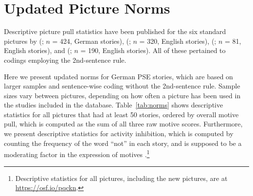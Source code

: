 \documentclass[man,a4paper,mask]{apa6}\usepackage[]{graphicx}\usepackage[]{color}
\begin{document}
\section{Updated Picture Norms}

Descriptive picture pull statistics have been published for the six standard pictures by \citeauthor{schultheiss_AssessmentImplicitMotives_2001} (\citeyear{schultheiss_AssessmentImplicitMotives_2001}; $n$ = 424, German stories), \citeauthor{pang_assessing_2005} (\citeyear{pang_assessing_2005}; $n$ = 320, English stories), \citeauthor{pang_ContentCodingMethods_2010} (\citeyear{pang_ContentCodingMethods_2010}; $n$ = 81, English stories), and \citeauthor{schultheiss_AreImplicitExplicit_2009} (\citeyear{schultheiss_AreImplicitExplicit_2009}; $n$ = 190, English stories). All of these pertained to codings employing the 2nd-sentence rule.

Here we present updated norms for German PSE stories, which are based on larger samples and sentence-wise coding without the 2nd-sentence rule. Sample sizes vary between pictures, depending on how often a picture has been used in the studies included in the database. Table~\ref{tab:norms} shows descriptive statistics for all pictures that had at least 50 stories, ordered by overall motive pull, which is computed as the sum of all three raw motive scores. Furthermore, we present descriptive statistics for activity inhibition, which is computed by counting the frequency of the word ``not'' in each story, and is supposed to be a moderating factor in the expression of motives \parencite{langens_ActivityInhibition_2010}.\footnote{Descriptive statistics for all pictures, including the new pictures, are at \url{https://osf.io/pqckn}.}
\end{document}
